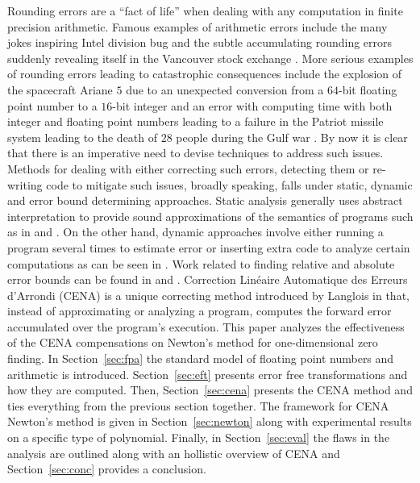 \documentclass{standalone}
\begin{document}
	Rounding errors are a ``fact of life'' when dealing with any computation in finite precision arithmetic. Famous examples of arithmetic errors include the many jokes inspiring Intel division bug \cite{sharangpani1994statistical} and the subtle accumulating rounding errors suddenly revealing itself in the Vancouver stock exchange \cite{mackintosh2015}. More serious examples of rounding errors leading to catastrophic consequences include the explosion of the spacecraft Ariane $5$ due to an unexpected conversion from a $64$-bit floating point number to a $16$-bit integer \cite{lions1996ariane} and an error with computing time with both integer and floating point numbers leading to a failure in the Patriot missile system leading to the death of $28$ people during the Gulf war \cite{skeel}. By now it is clear that there is an imperative need to devise techniques to address such issues. Methods for dealing with either correcting such errors, detecting them or re-writing code to mitigate such issues, broadly speaking, falls under static, dynamic and error bound determining approaches. Static analysis generally uses abstract interpretation to provide sound approximations of the semantics of programs such as in \cite{titolo2018abstract} and \cite{martel2017floating}. On the other hand, dynamic approaches involve either running a program several times to estimate error or inserting extra code to analyze certain computations as can be seen in \cite{lam2016fine}. Work related to finding relative and absolute error bounds can be found in \cite{darulova2014sound} and \cite{rubio2016floating}. Correction Linéaire Automatique des Erreurs d'Arrondi (CENA) is a unique correcting method introduced by Langlois in \cite{langlois2001automatic} that, instead of approximating or analyzing a program, computes the forward error accumulated over the program's execution. This paper analyzes the effectiveness of the CENA compensations on Newton's method for one-dimensional zero finding. In Section~\ref{sec:fpa} the standard model of floating point numbers and arithmetic is introduced. Section~\ref{sec:eft} presents error free transformations and how they are computed. Then, Section~\ref{sec:cena} presents the CENA method and ties everything from the previous section together. The framework for CENA Newton's method is given in Section~\ref{sec:newton} along with experimental results on a specific type of polynomial. Finally, in Section~\ref{sec:eval} the flaws in the analysis are outlined along with an hollistic overview of CENA and Section~\ref{sec:conc} provides a conclusion. 
\end{document}
